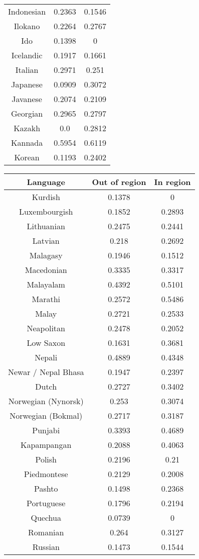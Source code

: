 \begin{figure}[h]
\begin{tabular}{ccc}
Indonesian&0.2363&0.1546\\
Ilokano&0.2264&0.2767\\
Ido&0.1398&0\\
Icelandic&0.1917&0.1661\\
Italian&0.2971&0.251\\
Japanese&0.0909&0.3072\\
Javanese&0.2074&0.2109\\
Georgian&0.2965&0.2797\\
Kazakh&0.0&0.2812\\
Kannada&0.5954&0.6119\\
Korean&0.1193&0.2402\\
\end{tabular}
\end{figure}
\begin{figure}[h]
\begin{tabular}{ccc}\hline\hline
Language&Out of region&In region\\
\hline
Kurdish&0.1378&0\\
Luxembourgish&0.1852&0.2893\\
Lithuanian&0.2475&0.2441\\
Latvian&0.218&0.2692\\
Malagasy&0.1946&0.1512\\
Macedonian&0.3335&0.3317\\
Malayalam&0.4392&0.5101\\
Marathi&0.2572&0.5486\\
Malay&0.2721&0.2533\\
Neapolitan&0.2478&0.2052\\
Low Saxon&0.1631&0.3681\\
Nepali&0.4889&0.4348\\
Newar / Nepal Bhasa&0.1947&0.2397\\
Dutch&0.2727&0.3402\\
Norwegian (Nynorsk)&0.253&0.3074\\
Norwegian (Bokmal)&0.2717&0.3187\\
Punjabi&0.3393&0.4689\\
Kapampangan&0.2088&0.4063\\
Polish&0.2196&0.21\\
Piedmontese&0.2129&0.2008\\
Pashto&0.1498&0.2368\\
Portuguese&0.1796&0.2194\\
Quechua&0.0739&0\\
Romanian&0.264&0.3127\\
Russian&0.1473&0.1544\\

\end{tabular}
\end{figure}
